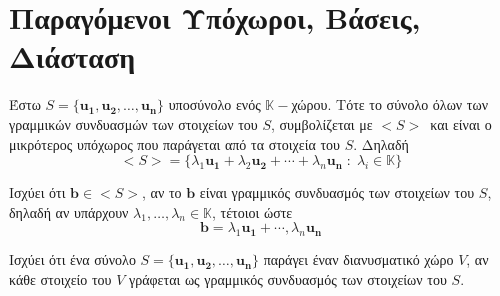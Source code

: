 \documentclass[a4paper,table]{report}
\begin{document}
\section*{Παραγόμενοι Υπόχωροι, Βάσεις, Διάσταση}

Έστω $ S = \{ \mathbf{u_{1}}, \mathbf{u_{2}}, \ldots, \mathbf{u_{n}} \} $ 
υποσύνολο ενός $ \mathbb{K}- $χώρου. Τότε το σύνολο \textcolor{Col1}{όλων} 
των γραμμικών συνδυασμών των στοιχείων του $S$, συμβολίζεται με $ < S >  $ και 
είναι ο \textcolor{Col1}{μικρότερος} υπόχωρος που παράγεται από τα στοιχεία του $S$. 
Δηλαδή 
\[
  < S > = \{ \lambda _{1} \mathbf{u_{1}} + \lambda _{2} \mathbf{u_{2}} + \cdots + 
  \lambda _{n} \mathbf{u_{n}} \; : \; \lambda _{i} \in \mathbb{K} \}   
\] 

\begin{myitemize}[leftmargin=*]
  \item Ισχύει ότι $ \mathbf{b} \in < S > $, αν το $ \mathbf{b} $ είναι 
    γραμμικός συνδυασμός των στοιχείων του $S$, δηλαδή αν υπάρχουν 
    $ \lambda _{1}, \ldots, \lambda _{n} \in \mathbb{K} $, τέτοιοι ώστε 
    \[ 
      \mathbf{b} = \lambda _{1} \mathbf{u_{1}} + \cdots, 
      \lambda _{n} \mathbf{u_{n}} 
    \]
  \item Ισχύει ότι ένα σύνολο $ S = \{ \mathbf{u_{1}}, \mathbf{u_{2}}, 
    \ldots, \mathbf{u_{n}} \} $ \textcolor{Col1}{παράγει} έναν διανυσματικό χώρο $V$, 
    αν \textcolor{Col1}{κάθε} στοιχείο του $V$ γράφεται ως γραμμικός συνδυασμός 
    των στοιχείων του $S$. 
\end{myitemize}
\end{document}
